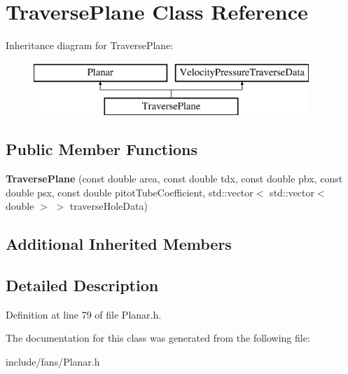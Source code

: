 \hypertarget{class_traverse_plane}{}\section{Traverse\+Plane Class Reference}
\label{class_traverse_plane}
Inheritance diagram for Traverse\+Plane\+:\begin{figure}[H]
\begin{center}
\leavevmode
\includegraphics[height=2.000000cm]{dc/d2a/class_traverse_plane}
\end{center}
\end{figure}
\subsection*{Public Member Functions}
\begin{DoxyCompactItemize}
\item 
\mbox{\label{class_traverse_plane_abbe5d384cc7fbd35c19c4f840247769f}} 
{\bfseries Traverse\+Plane} (const double area, const double tdx, const double pbx, const double psx, const double pitot\+Tube\+Coefficient, std\+::vector$<$ std\+::vector$<$ double $>$ $>$ traverse\+Hole\+Data)
\end{DoxyCompactItemize}
\subsection*{Additional Inherited Members}


\subsection{Detailed Description}


Definition at line 79 of file Planar.\+h.



The documentation for this class was generated from the following file\+:\begin{DoxyCompactItemize}
\item 
include/fans/Planar.\+h\end{DoxyCompactItemize}
